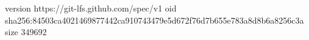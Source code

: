 version https://git-lfs.github.com/spec/v1
oid sha256:84503ca4021469877442ca910743479e5d672f76d7b655e783a8d8b6a8256c3a
size 349692
